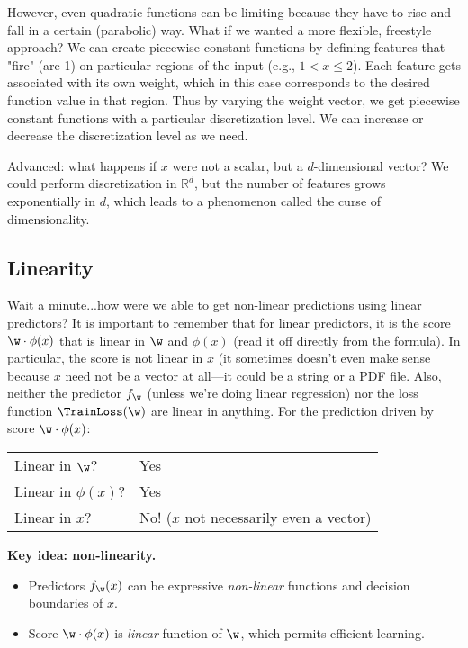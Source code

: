 However, even quadratic functions can be limiting because they have to rise and fall in a certain (parabolic) way.
What if we wanted a more flexible, freestyle approach?
% 
We can create piecewise constant functions by defining features that "fire" (are 1) on particular regions of the input (e.g., $1 < x \le 2$).
Each feature gets associated with its own weight, which in this case corresponds to the desired function value in that region.
% 
Thus by varying the weight vector, we get piecewise constant functions with a particular discretization level.
We can increase or decrease the discretization level as we need.

Advanced: what happens if $x$ were not a scalar, but a $d$-dimensional vector?
We could perform discretization in $\mathbb{R}^d$,
but the number of features grows exponentially in $d$,
which leads to a phenomenon called the curse of dimensionality.


\subsection{Linearity}
Wait a minute...how were we able to get non-linear predictions using linear predictors?
% 
It is important to remember that for linear predictors, it is the score $\w \cdot \phi(x)$ that is linear in $\w$ and $\phi(x)$ (read it off directly from the formula).
In particular, the score is not linear in $x$ (it sometimes doesn't even make sense because $x$ need not be a vector at all---it could be a string or a PDF file.
Also, neither the predictor $f_{\w}$ (unless we're doing linear regression) nor the loss function $\TrainLoss(\w)$ are linear in anything.
For the prediction driven by score $\w \cdot \phi(x)$:
\begin{center}
  \begin{tabular}{ll}
    Linear in $\w$? & Yes\\
    Linear in $\phi(x)$? & Yes\\
    Linear in $x$? & No! ($x$ not necessarily even a vector)
  \end{tabular}
\end{center}

\begin{example}
  \textbf{Key idea: non-linearity.}
  \begin{itemize}
    \item Predictors $f_{\w}(x)$ can be expressive \textit{non-linear} functions and decision boundaries of $x$.
    \item Score $\w \cdot \phi(x)$ is \textit{linear} function of $\w$, which permits efficient learning.
  \end{itemize}
\end{example}


